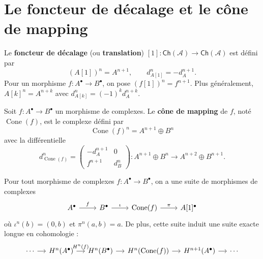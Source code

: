 \section{Le foncteur de décalage et le cône de mapping}%
\label{sec:shift-cone}

\begin{definition}\label{def:shift-functor}
Le \textbf{foncteur de décalage} (ou \textbf{translation})
$[1] \colon \mathsf{Ch}(\mathcal{A}) \to \mathsf{Ch}(\mathcal{A})$
est défini par
\[
  (A[1])^n = A^{n+1}, \qquad d_{A[1]}^n = -d_A^{n+1}.
\]
Pour un morphisme $f \colon A^\bullet \to B^\bullet$, on pose
$(f[1])^n = f^{n+1}$. Plus généralement, $A[k]^n = A^{n+k}$ avec
$d_{A[k]}^n = (-1)^k d_A^{n+k}$.
\end{definition}

\begin{definition}\label{def:mapping-cone}
Soit $f \colon A^\bullet \to B^\bullet$ un morphisme de complexes.
Le \textbf{cône de mapping} de $f$, noté $\operatorname{Cone}(f)$,
est le complexe défini par
\[
  \operatorname{Cone}(f)^n = A^{n+1} \oplus B^n
\]
avec la différentielle
\[
  d_{\operatorname{Cone}(f)}^n =
  \begin{pmatrix} -d_A^{n+1} & 0 \\ f^{n+1} & d_B^n \end{pmatrix}
  \colon A^{n+1} \oplus B^n \longrightarrow A^{n+2} \oplus B^{n+1}.
\]
\end{definition}

\begin{proposition}\label{prop:cone-exact-triangle}
Pour tout morphisme de complexes $f \colon A^\bullet \to B^\bullet$,
on a une suite de morphismes de complexes
\[
\begin{tikzcd}
A^\bullet \arrow[r, "f"] & B^\bullet \arrow[r, "\iota"]
  & \operatorname{Cone}(f) \arrow[r, "\pi"] & A[1]^\bullet
\end{tikzcd}
\]
où $\iota^n(b) = (0, b)$ et $\pi^n(a, b) = a$. De plus, cette suite
induit une suite exacte longue en cohomologie :
\[
\begin{tikzcd}[column sep=small]
\cdots \arrow[r]
& H^n(A^\bullet) \arrow[r, "H^n(f)"]
& H^n(B^\bullet) \arrow[r]
& H^n(\operatorname{Cone}(f)) \arrow[r]
& H^{n+1}(A^\bullet) \arrow[r]
& \cdots
\end{tikzcd}
\]
\end{proposition}

